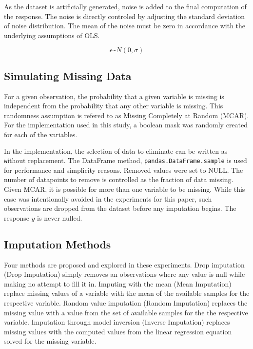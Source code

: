 \documentclass[../../paper.tex]{subfiles}
\begin{document}
As the dataset is artificially generated, noise is added to the final
computation of the response.
The noise is directly controled by adjusting the standard deviation of noise distribution.
The mean of the noise must be zero in accordance with the underlying assumptions of OLS.

%
\begin{equation}\label{eq:epsilon_def}
  \epsilon \text{\textasciitilde} N(0, \sigma)
\end{equation}
%
%


\subsection{Simulating Missing Data}
For a given observation, the probability that a given variable is missing is
independent from the probability that any other variable is missing. This randomness
assumption is refered to as Missing Completely at Random (MCAR). For the implementation
used in this study, a boolean mask was randomly created for each
of the variables.

In the implementation, the selection of data to eliminate can be written as
\texttt without replacement.
The DataFrame method, \texttt{pandas.DataFrame.sample} is used for
performance and simplicity reasons. Removed values were set to NULL. The number of
datapoints to remove is controlled as the fraction of data missing. Given MCAR,
it is possible for more than one variable to be missing. While this case was intentionally avoided in the experiments for this paper, such observations are dropped from the dataset before any imputation begins.
The response $y$ is never nulled.


\subsection{Imputation Methods}

Four methods are proposed and explored in these experiments.
Drop imputation (Drop Imputation) simply removes an observations where any value is null while making no attempt to fill it in.
Imputing with the mean (Mean Imputation) replace missing values of a variable with the mean of the available samples for the respective variable.
Random value imputation (Random Imputation) replaces the missing value with a value from the set of available samples for the the respective variable.
Imputation through model inversion (Inverse Imputation) replaces missing values with the computed values from the linear regression equation solved for the missing variable.
\end{document}
